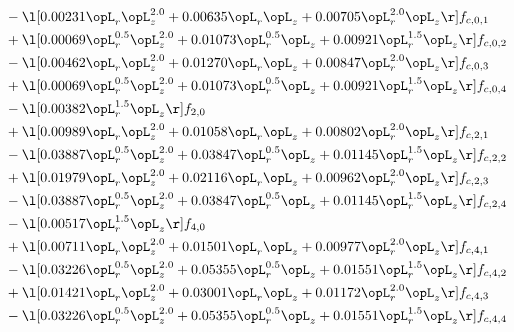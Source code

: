\begin{alignat}{2}
& - \l[  0.00231 \opL_r \opL_z^{2.0} +  0.00635 \opL_r \opL_z +  0.00705 \opL_r^{2.0} \opL_z  \r] f_{c,0,1} \nonumber \\ 
& + \l[  0.00069 \opL_r^{0.5} \opL_z^{2.0} +  0.01073 \opL_r^{0.5} \opL_z +  0.00921 \opL_r^{1.5} \opL_z  \r] f_{c,0,2} \nonumber \\ 
& - \l[  0.00462 \opL_r \opL_z^{2.0} +  0.01270 \opL_r \opL_z +  0.00847 \opL_r^{2.0} \opL_z  \r] f_{c,0,3} \nonumber \\ 
& + \l[  0.00069 \opL_r^{0.5} \opL_z^{2.0} +  0.01073 \opL_r^{0.5} \opL_z +  0.00921 \opL_r^{1.5} \opL_z  \r] f_{c,0,4} \nonumber \\ 
& - \l[  0.00382 \opL_r^{1.5} \opL_z  \r] f_{2,0} \nonumber \\ 
& + \l[  0.00989 \opL_r \opL_z^{2.0} +  0.01058 \opL_r \opL_z +  0.00802 \opL_r^{2.0} \opL_z  \r] f_{c,2,1} \nonumber \\ 
& - \l[  0.03887 \opL_r^{0.5} \opL_z^{2.0} +  0.03847 \opL_r^{0.5} \opL_z +  0.01145 \opL_r^{1.5} \opL_z  \r] f_{c,2,2} \nonumber \\ 
& + \l[  0.01979 \opL_r \opL_z^{2.0} +  0.02116 \opL_r \opL_z +  0.00962 \opL_r^{2.0} \opL_z  \r] f_{c,2,3} \nonumber \\ 
& - \l[  0.03887 \opL_r^{0.5} \opL_z^{2.0} +  0.03847 \opL_r^{0.5} \opL_z +  0.01145 \opL_r^{1.5} \opL_z  \r] f_{c,2,4} \nonumber \\ 
& - \l[  0.00517 \opL_r^{1.5} \opL_z  \r] f_{4,0} \nonumber \\ 
& + \l[  0.00711 \opL_r \opL_z^{2.0} +  0.01501 \opL_r \opL_z +  0.00977 \opL_r^{2.0} \opL_z  \r] f_{c,4,1} \nonumber \\ 
& - \l[  0.03226 \opL_r^{0.5} \opL_z^{2.0} +  0.05355 \opL_r^{0.5} \opL_z +  0.01551 \opL_r^{1.5} \opL_z  \r] f_{c,4,2} \nonumber \\ 
& + \l[  0.01421 \opL_r \opL_z^{2.0} +  0.03001 \opL_r \opL_z +  0.01172 \opL_r^{2.0} \opL_z  \r] f_{c,4,3} \nonumber \\ 
& - \l[  0.03226 \opL_r^{0.5} \opL_z^{2.0} +  0.05355 \opL_r^{0.5} \opL_z +  0.01551 \opL_r^{1.5} \opL_z  \r] f_{c,4,4} \nonumber \\ 
\end{alignat} 


